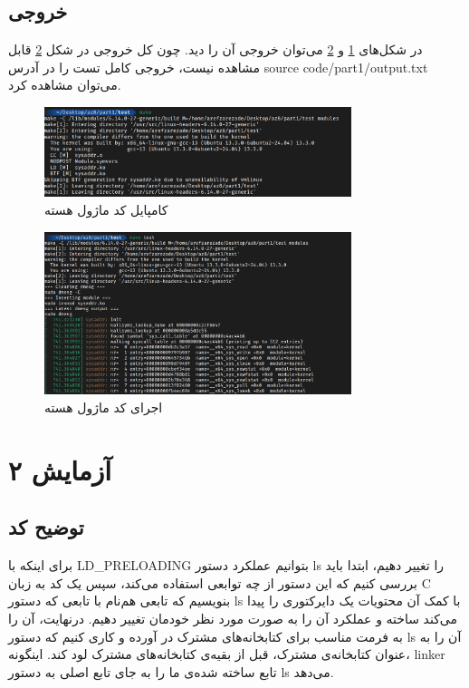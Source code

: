 \documentclass[12pt]{article}
\begin{document}
        \subsection{خروجی}
        در شکل‌های 
        \ref{im5}
        و 
        \ref{im6}
        می‌توان خروجی آن را دید. چون کل خروجی در شکل
        \ref{im6}
        قابل مشاهده نیست، خروجی کامل تست را در آدرس
        \textenglish{source code/part1/output.txt}
        می‌توان مشاهده کرد.

        \begin{figure}[H]
		\centering
		\includegraphics[width=0.8\textwidth]{report8-resources/5.png}
		\caption{کامپایل کد ماژول هسته}
            \label{im5}
	\end{figure}

        \begin{figure}[H]
		\centering
		\includegraphics[width=0.8\textwidth]{report8-resources/6.png}
		\caption{اجرای کد ماژول هسته}
            \label{im6}
	\end{figure}
        
        

        \section{آزمایش ۲}

        \subsection{توضیح کد}

        برای اینکه با 
        \textenglish{LD\_PRELOADING}
        بتوانیم عملکرد دستور
        \textenglish{ls}
        را تغییر دهیم، ابتدا باید بررسی کنیم که این دستور از چه توابعی استفاده می‌کند، سپس یک کد به زبان
        \textenglish{C}
        بنویسیم که تابعی هم‌نام با تابعی که دستور
        \textenglish{ls}
        با کمک آن محتویات یک دایرکتوری را پیدا می‌کند ساخته و عملکرد آن را به صورت مورد نظر خودمان تغییر دهیم. درنهایت، آن را به فرمت مناسب برای کتابخانه‌های مشترک در آورده و کاری کنیم که دستور 
        \textenglish{ls}
        آن را به عنوان کتابخانه‌ی مشترک، قبل از بقیه‌ی کتابخانه‌های مشترک لود کند. اینگونه، 
        \textenglish{linker}
        تابع ساخته شده‌ی ما را به جای تابع اصلی به دستور 
        \textenglish{ls}
        می‌دهد.
        
\end{document}

